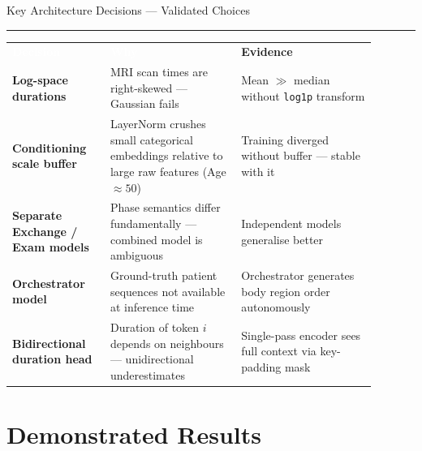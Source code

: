 \documentclass[aspectratio=169,12pt]{beamer}
\newcommand{\tealsep}{\vspace{1pt}\textcolor{SiemensTeal}{\rule{\linewidth}{1pt}}\vspace{4pt}}
\begin{document}
\begin{frame}[shrink=12]{Key Architecture Decisions — Validated Choices}
\tealsep
\vspace{4pt}
\begin{tabular}{p{0.24\linewidth}p{0.32\linewidth}p{0.33\linewidth}}
\rowcolor{SiemensNavy}
\textcolor{white}{\textbf{Decision}} &
\textcolor{white}{\textbf{Why}} &
\textcolor{SiemensTeal}{\textbf{Evidence}} \\[2pt]
\rowcolor{SiemensLight}
\textbf{Log-space durations} & MRI scan times are right-skewed — Gaussian fails & Mean $\gg$ median without \texttt{log1p} transform \\[4pt]
\rowcolor{white}
\textbf{Conditioning scale buffer} & LayerNorm crushes small categorical embeddings relative to large raw features (Age $\approx 50$) & Training diverged without buffer — stable with it \\[4pt]
\rowcolor{SiemensLight}
\textbf{Separate Exchange / Exam models} & Phase semantics differ fundamentally — combined model is ambiguous & Independent models generalise better \\[4pt]
\rowcolor{white}
\textbf{Orchestrator model} & Ground-truth patient sequences not available at inference time & Orchestrator generates body region order autonomously \\[4pt]
\rowcolor{SiemensLight}
\textbf{Bidirectional duration head} & Duration of token $i$ depends on neighbours — unidirectional underestimates & Single-pass encoder sees full context via key-padding mask \\
\end{tabular}
\end{frame}

\section{Demonstrated Results}
\end{document}
